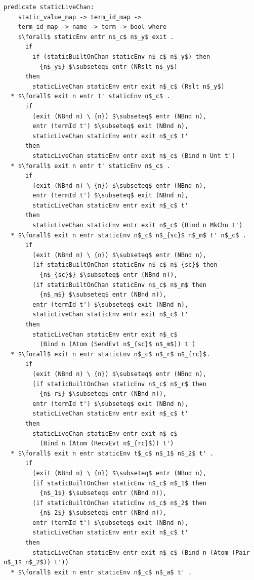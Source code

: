\documentclass[letterpaper, 11pt]{extarticle}
\begin{document}
\begin{lstlisting}[language=logic, mathescape]
  predicate staticLiveChan:
    static_value_map -> term_id_map ->
    term_id_map -> name -> term -> bool where
    $\forall$ staticEnv entr n$_c$ n$_y$ exit .
      if
        if (staticBuiltOnChan staticEnv n$_c$ n$_y$) then
          {n$_y$} $\subseteq$ entr (NRslt n$_y$)
      then
        staticLiveChan staticEnv entr exit n$_c$ (Rslt n$_y$)
  * $\forall$ exit n entr t' staticEnv n$_c$ .
      if 
        (exit (NBnd n) \ {n}) $\subseteq$ entr (NBnd n),
        entr (termId t') $\subseteq$ exit (NBnd n),
        staticLiveChan staticEnv entr exit n$_c$ t'
      then 
        staticLiveChan staticEnv entr exit n$_c$ (Bind n Unt t')
  * $\forall$ exit n entr t' staticEnv n$_c$ .
      if
        (exit (NBnd n) \ {n}) $\subseteq$ entr (NBnd n),
        entr (termId t') $\subseteq$ exit (NBnd n),
        staticLiveChan staticEnv entr exit n$_c$ t'
      then 
        staticLiveChan staticEnv entr exit n$_c$ (Bind n MkChn t')
  * $\forall$ exit n entr staticEnv n$_c$ n$_{sc}$ n$_m$ t' n$_c$ .
      if
        (exit (NBnd n) \ {n}) $\subseteq$ entr (NBnd n),
        (if staticBuiltOnChan staticEnv n$_c$ n$_{sc}$ then
          {n$_{sc}$} $\subseteq$ entr (NBnd n)),
        (if staticBuiltOnChan staticEnv n$_c$ n$_m$ then 
          {n$_m$} $\subseteq$ entr (NBnd n)),
        entr (termId t') $\subseteq$ exit (NBnd n),
        staticLiveChan staticEnv entr exit n$_c$ t'
      then
        staticLiveChan staticEnv entr exit n$_c$
          (Bind n (Atom (SendEvt n$_{sc}$ n$_m$)) t')
  * $\forall$ exit n entr staticEnv n$_c$ n$_r$ n$_{rc}$.    
      if
        (exit (NBnd n) \ {n}) $\subseteq$ entr (NBnd n),
        (if staticBuiltOnChan staticEnv n$_c$ n$_r$ then
          {n$_r$} $\subseteq$ entr (NBnd n)),
        entr (termId t') $\subseteq$ exit (NBnd n),
        staticLiveChan staticEnv entr exit n$_c$ t'
      then
        staticLiveChan staticEnv entr exit n$_c$
          (Bind n (Atom (RecvEvt n$_{rc}$)) t')
  * $\forall$ exit n entr staticEnv t$_c$ n$_1$ n$_2$ t' .
      if
        (exit (NBnd n) \ {n}) $\subseteq$ entr (NBnd n),
        (if staticBuiltOnChan staticEnv n$_c$ n$_1$ then
          {n$_1$} $\subseteq$ entr (NBnd n)),
        (if staticBuiltOnChan staticEnv n$_c$ n$_2$ then
          {n$_2$} $\subseteq$ entr (NBnd n)),
        entr (termId t') $\subseteq$ exit (NBnd n),
        staticLiveChan staticEnv entr exit n$_c$ t'
      then
        staticLiveChan staticEnv entr exit n$_c$ (Bind n (Atom (Pair n$_1$ n$_2$)) t'))
  * $\forall$ exit n entr staticEnv n$_c$ n$_a$ t' . 

\end{lstlisting}
\end{document}
